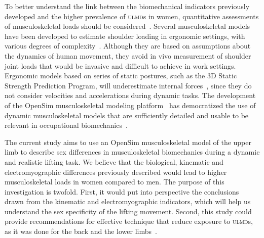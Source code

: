 To better understand the link between the biomechanical indicators previously developed and the higher prevalence of \textsc{ulmd}s in women, quantitative assessments of musculoskeletal loads should be considered~\cite{Garg2009-wl}.
Several musculoskeletal models have been developed to estimate shoulder loading in ergonomic settings, with various degrees of complexity~\cite{Dickerson2007-qj, Pontonnier2014-vx}.
Although they are based on assumptions about the dynamics of human movement, they avoid in vivo measurement of shoulder joint loads that would be invasive and difficult to achieve in work settings.
Ergonomic models based on series of static postures, such as the 3D Static Strength Prediction Program, will underestimate internal forces~\cite{Garg2009-wl}, since they do not consider velocities and accelerations during dynamic tasks.
The development of the OpenSim musculoskeletal modeling platform~\cite{Delp2007-ol} has democratized the use of dynamic musculoskeletal models that are sufficiently detailed and usable to be relevant in occupational biomechanics~\cite{Kim2017-zr, Mortensen2018-jr}.

The current study aims to use an OpenSim musculoskeletal model of the upper limb to describe sex differences in musculoskeletal biomechanics during a dynamic and realistic lifting task.
We believe that the biological, kinematic and electromyographic differences previously described would lead to higher musculoskeletal loads in women compared to men.
The purpose of this investigation is twofold.
First, it would put into perspective the conclusions drawn from the kinematic and electromyographic indicators, which will help us understand the sex specificity of the lifting movement.
Second, this study could provide recommendations for effective technique that reduce exposure to \textsc{ulmd}s, as it was done for the back and the lower limbs~\cite{Plamondon2014-xe, Plamondon2017-qa}.